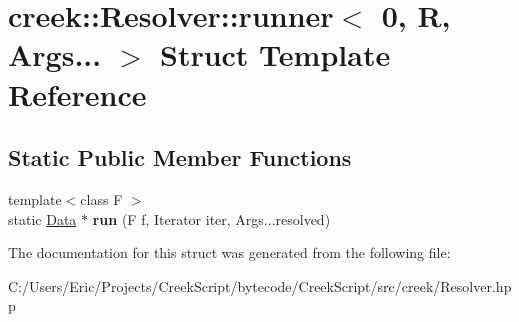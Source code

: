\hypertarget{structcreek_1_1_resolver_1_1runner_3_010_00_01_r_00_01_args_8_8_8_01_4}{}\section{creek\+:\+:Resolver\+:\+:runner$<$ 0, R, Args... $>$ Struct Template Reference}
\label{structcreek_1_1_resolver_1_1runner_3_010_00_01_r_00_01_args_8_8_8_01_4}
\subsection*{Static Public Member Functions}
\begin{DoxyCompactItemize}
\item 
{\footnotesize template$<$class F $>$ }\\static \hyperlink{classcreek_1_1_data}{Data} $\ast$ {\bfseries run} (F f, Iterator iter, Args...\+resolved)\hypertarget{structcreek_1_1_resolver_1_1runner_3_010_00_01_r_00_01_args_8_8_8_01_4_a7cfcd68a8d298797ab14d214c41a40a5}{}\label{structcreek_1_1_resolver_1_1runner_3_010_00_01_r_00_01_args_8_8_8_01_4_a7cfcd68a8d298797ab14d214c41a40a5}

\end{DoxyCompactItemize}


The documentation for this struct was generated from the following file\+:\begin{DoxyCompactItemize}
\item 
C\+:/\+Users/\+Eric/\+Projects/\+Creek\+Script/bytecode/\+Creek\+Script/src/creek/Resolver.\+hpp\end{DoxyCompactItemize}
